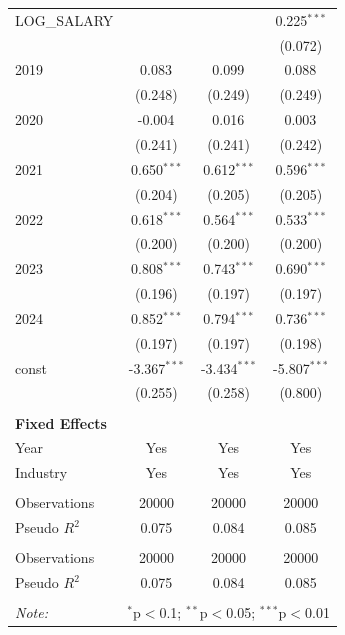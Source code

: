 \begin{table}[!htbp]
\begin{tabular}{@{\extracolsep{5pt}}lccc}
 LOG_SALARY & & & 0.225$^{***}$ \\
& & & (0.072) \\
 2019 & 0.083$^{}$ & 0.099$^{}$ & 0.088$^{}$ \\
& (0.248) & (0.249) & (0.249) \\
 2020 & -0.004$^{}$ & 0.016$^{}$ & 0.003$^{}$ \\
& (0.241) & (0.241) & (0.242) \\
 2021 & 0.650$^{***}$ & 0.612$^{***}$ & 0.596$^{***}$ \\
& (0.204) & (0.205) & (0.205) \\
 2022 & 0.618$^{***}$ & 0.564$^{***}$ & 0.533$^{***}$ \\
& (0.200) & (0.200) & (0.200) \\
 2023 & 0.808$^{***}$ & 0.743$^{***}$ & 0.690$^{***}$ \\
& (0.196) & (0.197) & (0.197) \\
 2024 & 0.852$^{***}$ & 0.794$^{***}$ & 0.736$^{***}$ \\
& (0.197) & (0.197) & (0.198) \\
 const & -3.367$^{***}$ & -3.434$^{***}$ & -5.807$^{***}$ \\
& (0.255) & (0.258) & (0.800) \\
 \hline &  &  &  \\
 \textbf{Fixed Effects} &  &  &  \\
 \quad Year & Yes & Yes & Yes \\
 \quad Industry & Yes & Yes & Yes \\
 \hline &  &  &  \\
 Observations & 20000 & 20000 & 20000 \\
 Pseudo $R^2$ & 0.075 & 0.084 & 0.085 \\
\hline \\[-1.8ex]
 Observations & 20000 & 20000 & 20000 \\
 Pseudo $R^2$ & 0.075 & 0.084 & 0.085 \\
\hline
\hline \\[-1.8ex]
\textit{Note:} & \multicolumn{3}{r}{$^{*}$p$<$0.1; $^{**}$p$<$0.05; $^{***}$p$<$0.01} \\
\end{tabular}
\end{table}